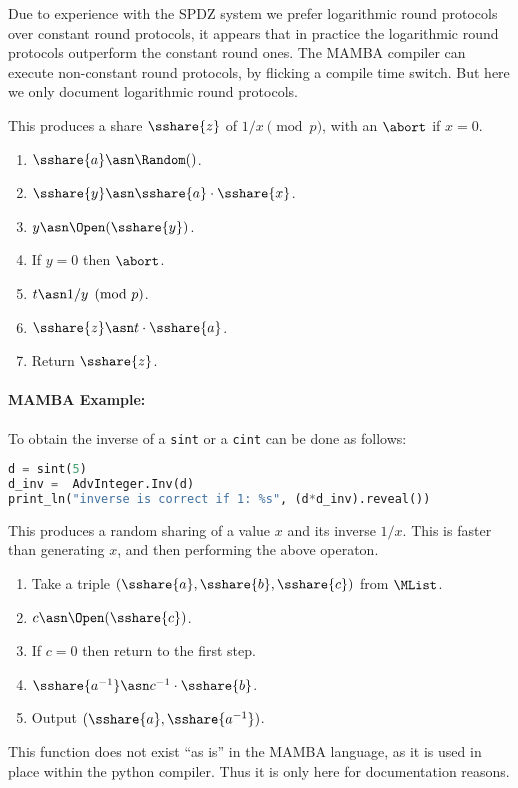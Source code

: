 Due to experience with the SPDZ system we prefer logarithmic
round protocols over constant round protocols, it appears that in
practice the logarithmic round protocols outperform the constant
round ones.
The MAMBA compiler can execute non-constant round protocols, by 
flicking a compile time switch. But here we only document
logarithmic round protocols.


This produces a share $\sshare{z}$ of $1/x \pmod{p}$, with an
$\abort$ if $x=0$.
\begin{enumerate}
\item $\sshare{a} \asn \Random()$.
\item $\sshare{y} \asn \sshare{a} \cdot \sshare{x}$.
\item $y \asn \Open(\sshare{y})$.
\item If $y=0$ then $\abort$.
\item $t \asn 1/y \pmod{p}$.
\item $\sshare{z} \asn t \cdot \sshare{a}$.
\item Return $\sshare{z}$.
\end{enumerate}
\paragraph{MAMBA Example:} To obtain the inverse of a \verb|sint| or a \verb|cint| can be done as follows: 
\begin{lstlisting}[language={python}]
d = sint(5)
d_inv =  AdvInteger.Inv(d)
print_ln("inverse is correct if 1: %s", (d*d_inv).reveal())
\end{lstlisting}

This produces a random sharing of a value $x$ and its inverse $1/x$.
This is faster than generating $x$, and then performing the above operaton.
\begin{enumerate}
\item Take a triple $(\sshare{a},\sshare{b},\sshare{c})$ from $\MList$.
\item $c \asn \Open(\sshare{c})$.
\item If $c=0$ then return to the first step.
\item $\sshare{a^{-1}} \asn c^{-1} \cdot \sshare{b}$.
\item Output $(\sshare{a},\sshare{a^{-1}})$.
\end{enumerate}
This function does not exist ``as is'' in the MAMBA language, as it
is used in place within the python compiler. Thus it is only here
for documentation reasons.

